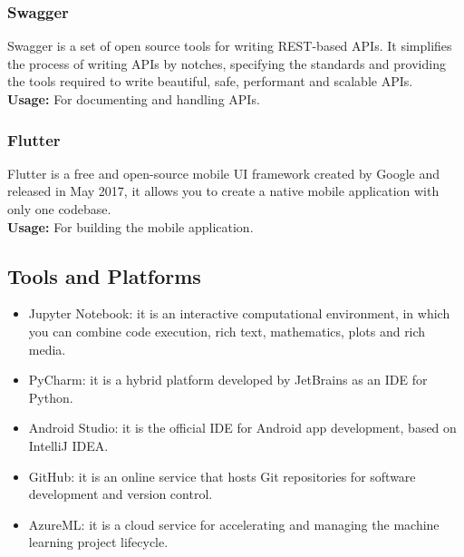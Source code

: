 \subsubsection{Swagger}
Swagger is a set of open source tools for writing REST-based APIs. It simplifies the process of writing APIs by notches, specifying the standards and providing the tools required to write beautiful, safe, performant and scalable APIs.
\\
\textbf{Usage:} For documenting and handling APIs.
\subsubsection{Flutter}
Flutter is a free and open-source mobile UI framework created by Google and released in May 2017, it allows you to create a native mobile application with only one codebase.
\\
\textbf{Usage:} For building the mobile application.


\subsection{Tools and Platforms}
\begin{itemize}
    \item Jupyter Notebook: it is an interactive computational environment, in which you can combine code execution, rich text, mathematics, plots and rich media.
    \item PyCharm: it is a hybrid platform developed by JetBrains as an IDE for Python.
    \item Android Studio: it is the official IDE for Android app development, based on IntelliJ IDEA.
    \item GitHub: it is an online service that hosts Git repositories for software development and version control.
    \item AzureML: it is a cloud service for accelerating and managing the machine learning project lifecycle.
\end{itemize}


